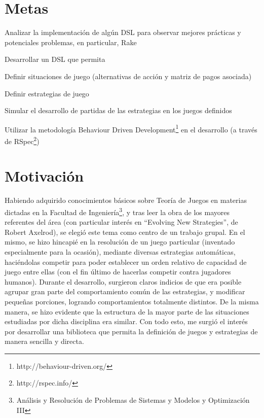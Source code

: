 \documentclass[10pt]{article}
\numberwithin{equation}{section}
\numberwithin{figure}{section}
\numberwithin{table}{section}
\begin{document}
\section{Metas}\label{metas}
\begin{list}{*}{}
  \item Analizar la implementación de algún DSL para observar mejores prácticas y potenciales problemas, en particular, Rake
  \item Desarrollar un DSL que permita
  \begin{list}{-}{}
    \item Definir situaciones de juego (alternativas de acción y matriz de pagos asociada)
    \item Definir estrategias de juego
    \item Simular el desarrollo de partidas de las estrategias en los juegos definidos
  \end{list}
  \item Utilizar la metodología Behaviour Driven Development\footnote{http://behaviour-driven.org/} en el desarrollo (a través de RSpec\footnote{http://rspec.info/})
\end{list}

\section{Motivación}\label{motivacions}
Habiendo adquirido conocimientos básicos sobre Teoría de Juegos en materias dictadas en la Facultad de Ingeniería\footnote{Análisis y Resolución de Problemas de Sistemas y Modelos y Optimización III}, y tras leer la obra de los mayores referentes del área\cite{Axe:01}\cite{Axe:02} (con particular interés en ``Evolving New Strategies'', de Robert Axelrod), se elegió este tema como centro de un trabajo grupal. En el mismo, se hizo hincapié en la resolución de un juego particular (inventado especialmente para la ocasión), mediante diversas estrategias automáticas, haciéndolas competir para poder establecer un orden relativo de capacidad de juego entre ellas (con el fin último de hacerlas competir contra jugadores humanos). Durante el desarrollo, surgieron claros indicios de que era posible agrupar gran parte del comportamiento común de las estrategias, y modificar pequeñas porciones, logrando comportamientos totalmente distintos. De la misma manera, se hizo evidente que la estructura de la mayor parte de las situaciones estudiadas por dicha disciplina era similar. Con todo esto, me surgió el interés por desarrollar una biblioteca que permita la definición de juegos y estrategias de manera sencilla y directa.\\
\end{document}
